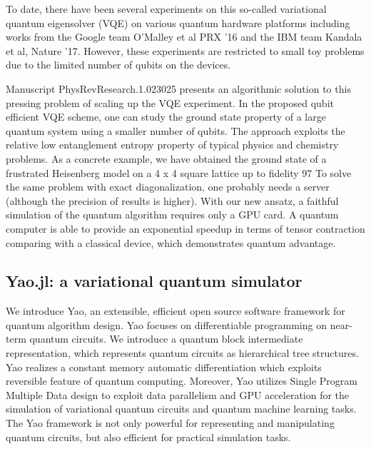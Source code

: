 \documentclass[]{article}
\begin{document}
To date, there have been several experiments on this so-called variational quantum eigensolver (VQE) on various quantum hardware platforms including works from the Google team O'Malley et al PRX '16  and the IBM team Kandala  et al, Nature '17.  However, these experiments are restricted to small toy problems due to the limited number of qubits on the devices.  

Manuscript PhysRevResearch.1.023025 presents an algorithmic solution to this pressing problem of scaling up the VQE experiment.  In the proposed qubit efficient VQE scheme, one can study the ground state property of a large quantum system using a smaller number of qubits. The approach exploits the relative low entanglement entropy property of typical physics and chemistry problems. As a concrete example, we have obtained the ground state of a frustrated Heisenberg model on a 4 x 4 square lattice up to fidelity 97%
To solve the same problem with exact diagonalization, one probably needs a server (although the precision of results is higher). With our new ansatz, a faithful simulation of the quantum algorithm requires only a GPU card. A quantum computer is able to provide an exponential speedup in terms of tensor contraction comparing with a classical device, which demonstrates quantum advantage.

\subsection{Yao.jl: a variational quantum simulator}
We introduce Yao, an extensible, efficient open source software framework for
quantum algorithm design. Yao focuses on differentiable programming on near-term quantum circuits. 
We introduce a quantum block intermediate representation, which represents quantum circuits as hierarchical tree structures. 
Yao realizes a constant memory automatic differentiation which exploits reversible feature of quantum computing. 
Moreover, Yao utilizes Single Program Multiple Data design to exploit data parallelism and GPU acceleration for the simulation of variational quantum circuits and quantum machine learning tasks. 
The Yao framework is not only powerful for representing and manipulating quantum
circuits, but also efficient for practical simulation tasks. 
\end{document}
